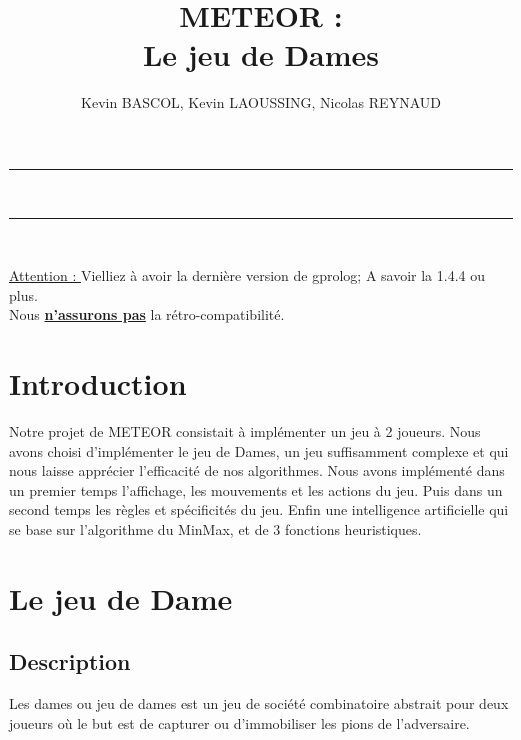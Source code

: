 \documentclass[10pt,a4paper]{report}
\author{Kevin BASCOL, Kevin LAOUSSING, Nicolas REYNAUD}
\title{METEOR : \\ \vspace*{0.5cm} Le jeu de Dames}
\begin{document}
\makeatletter
	\begin{titlepage}
	
	\centering
		{
		\vspace*{5cm}
		\hrule height 2pt
		\vspace{0.7cm}
		\Huge \textbf{\@title}}\\
		\vspace{0.7cm}
		\hrule height 2pt
		
		\vfill
		\vspace{1cm}
		\@author\\
		\end{titlepage}
\makeatother
\setcounter{secnumdepth}{4}
\setcounter{tocdepth}{3}
\renewcommand{\contentsname}{Sommaire}
\begingroup\makeatletter
\def\@makeschapterhead#1{%
  {\parindent \z@ \raggedright
    \normalfont
    \interlinepenalty\@M
    \Huge \bfseries  #1\par\nobreak
    \vskip 20pt%
  }}\makeatother
\tableofcontents
\endgroup
\thispagestyle{empty}
\setcounter{page}{0}
\newpage



\underline{Attention : } Vielliez à avoir la dernière version de gprolog; A savoir la 1.4.4 ou plus.\\
Nous \underline{\textbf{n'assurons pas}} la rétro-compatibilité. 
\section{Introduction}
	Notre projet de METEOR consistait à implémenter un jeu à 2 joueurs. Nous avons choisi d'implémenter le jeu de Dames, un jeu suffisamment complexe et qui nous laisse apprécier l'efficacité de nos algorithmes.
Nous avons implémenté dans un premier temps l'affichage, les mouvements et les actions du jeu. Puis dans un second temps les règles et spécificités du jeu. Enfin une intelligence artificielle qui se base sur l'algorithme du MinMax, et de 3 fonctions heuristiques.
\section{Le jeu de Dame}
	\subsection{Description}
	Les dames ou jeu de dames est un jeu de société combinatoire abstrait pour deux joueurs où le but est de capturer ou d'immobiliser les pions de l'adversaire.
\end{document}
